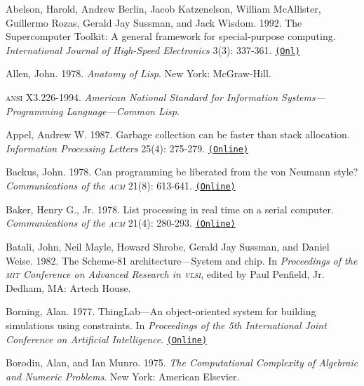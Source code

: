 \documentclass[8pt,oneside]{book}
\newcommand{\acronym}[1]{\textsc{\MakeLowercase{#1}}}
\newcommand{\code}[1]{\texttt{#1}}
\begin{document}
 \label{Abelson et al. 1992}
Abelson, Harold, Andrew Berlin, Jacob Katzenelson, William McAllister,
Guillermo Rozas, Gerald Jay Sussman, and Jack Wisdom. 1992.  The Supercomputer
Toolkit: A general framework for special-purpose computing.
\textit{International Journal of High-Speed Electronics} 3(3): 337-361.
\href{http://www.hpl.hp.com/techreports/94/HPL-94-30.html}{\code{(Onl)}}

 \label{Allen 1978}
Allen, John.  1978.  \textit{Anatomy of Lisp}. New York: McGraw-Hill.

 \label{ANSI 1994}
\acronym{ANSI} X3.226-1994. \textit{American National Standard for Information
Sys\-tems---Programming Language---Common Lisp}.

 \label{Appel 1987}
Appel, Andrew W.  1987.  Garbage collection can be faster than stack
allocation.  \textit{Information Processing Letters} 25(4): 275-279.
\href{http://citeseer.ist.psu.edu/viewdoc/summary?doi=10.1.1.39.8219}{\code{(Online)}}

 \label{Backus 1978}
Backus, John.  1978.  Can programming be liberated from the von Neumann style?
\textit{Communications of the \acronym{ACM}} 21(8): 613-641.
\href{http://www.stanford.edu/class/cs242/readings/backus.pdf}{\code{(Online)}}

 \label{Baker (1978)}
Baker, Henry G., Jr.  1978.  List processing in real time on a serial computer.
\textit{Communications of the \acronym{ACM}} 21(4): 280-293.
\href{http://dspace.mit.edu/handle/1721.1/41976}{\code{(Online)}}

 \label{Batali et al. 1982}
Batali, John, Neil Mayle, Howard Shrobe, Gerald Jay Sussman, and Daniel Weise.
1982.  The Scheme-81 architecture---System and chip.  In \textit{Proceedings of
the \acronym{MIT} Conference on Advanced Research in \acronym{VLSI}}, edited by
Paul Penfield, Jr. Dedham, MA: Artech House.

 \label{Borning (1977)}
Borning, Alan.  1977.  ThingLab---An object-oriented system for building
simulations using constraints. In \textit{Proceedings of the 5th International
Joint Conference on Artificial Intelligence}.
\href{http://ijcai.org/Past\%20Proceedings/IJCAI-77-VOL1/PDF/085.pdf}{\code{(Online)}}

 \label{Borodin and Munro (1975)}
Borodin, Alan, and Ian Munro.  1975.  \textit{The Computational Complexity of
Algebraic and Numeric Problems}. New York: American Elsevier.
\end{document}
